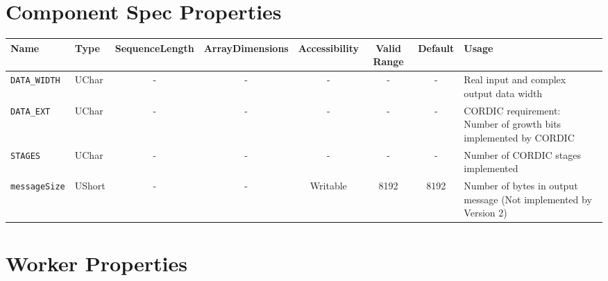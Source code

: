 \documentclass{article}
\begin{document}
\begin{landscape}
	\section*{Component Spec Properties}
	\begin{scriptsize}
		\begin{tabular}{|p{3cm}|p{1.5cm}|c|c|c|c|c|p{7cm}|}
			\hline
			\rowcolor{blue}
			Name                & Type   & SequenceLength & ArrayDimensions & Accessibility      & Valid Range & Default & Usage                                    \\
			\hline
			\verb+DATA_WIDTH+   & UChar  & -              & -               & -          & -           & -       & Real input and complex output data width \\
			\hline
			\verb+DATA_EXT+     & UChar  & -              & -               & -          & -           & -       & CORDIC requirement: Number of growth bits implemented by CORDIC \\
			\hline
			\verb+STAGES+       & UChar  & -              & -               & -          & -           & -       & Number of CORDIC stages implemented \\
			\hline
			\verb+messageSize+ & UShort & -              & -               & Writable & 8192        & 8192    & Number of bytes in output message (Not implemented by Version 2)\\
			\hline
		\end{tabular}
	\end{scriptsize}

	\section*{Worker Properties}

\end{landscape}
\end{document}
